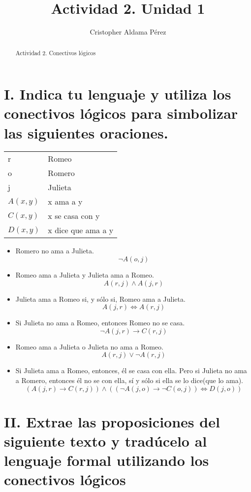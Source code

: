 \documentclass[a4paper,10pt]{article}
\title{Actividad 2. Unidad 1}
\author{Cristopher Aldama Pérez}
\begin{document}
\maketitle

\begin{abstract}
Actividad 2. Conectivos lógicos
\end{abstract}

\section{I. Indica tu lenguaje y utiliza los conectivos lógicos para simbolizar las siguientes oraciones.}

\begin{center}
\begin{tabular}{ll}
r & Romeo\\
o & Romero\\
j & Julieta\\
\(A(x, y)\) & x ama a y\\
\(C(x, y)\) & x se casa con y\\
\(D(x, y)\) & x dice que ama a y\\
\end{tabular}
\end{center}


\begin{itemize}
 \item Romero no ama a Julieta. \[\neg A(o, j)\]
 \item Romeo ama a Julieta y Julieta ama a Romeo. \[A(r, j) \land A(j, r)\]
 \item Julieta ama a Romeo si, y sólo si, Romeo ama a Julieta. \[A(j, r) \iff A(r, j)\]
 \item Si Julieta no ama a Romeo, entonces Romeo no se casa. \[\neg A(j,r) \to C(r, j)\]
 \item Romeo ama a Julieta o Julieta no ama a Romeo. \[A(r,j) \lor \neg A(r,j)\]
 \item Si Julieta ama a Romeo, entonces, él se casa con ella. Pero si Julieta no ama a Romero, entonces él no se con ella, sí y sólo si ella se lo dice(que lo ama). \[(A(j,r) \to C(r,j) ) \land ((\neg A(j, o) \to \neg C(o, j)) \iff D(j, o))\] 
\end{itemize}

\section{II. Extrae las proposiciones del siguiente texto y tradúcelo al lenguaje formal utilizando los conectivos lógicos}
\end{document}
